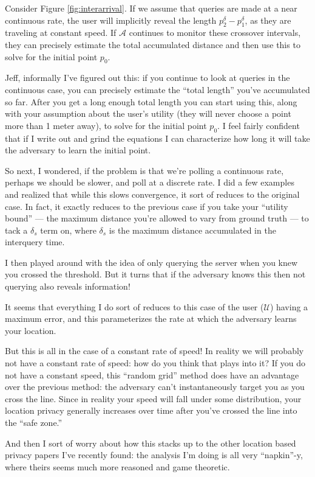\documentclass{article}
\begin{document}
Consider Figure \ref{fig:interarrival}.  If we assume that queries are
made at a near continuous rate, the user will implicitly reveal the
length $p_2^{\delta}-p_1^{\delta}$, as they are traveling at constant
speed.  If $\mathcal{A}$ continues to monitor these crossover
intervals, they can precisely estimate the total accumulated distance
and then use this to solve for the initial point $p_0$.

Jeff, informally I've figured out this: if you continue to look at
queries in the continuous case, you can precisely estimate the ``total
length'' you've accumulated so far.  After you get a long enough total
length you can start using this, along with your assumption about the
user's utility (they will never choose a point more than 1 meter
away), to solve for the initial point $p_0$.  I feel fairly confident
that if I write out and grind the equations I can characterize how
long it will take the adversary to learn the initial point.

So next, I wondered, if the problem is that we're polling a continuous
rate, perhaps we should be slower, and poll at a discrete rate.  I did
a few examples and realized that while this slows convergence, it sort
of reduces to the original case.  In fact, it exactly reduces to the
previous case if you take your ``utility bound'' --- the maximum
distance you're allowed to vary from ground truth --- to tack a
$\delta_s$ term on, where $\delta_s$ is the maximum distance
accumulated in the interquery time.

I then played around with the idea of only querying the server when
you knew you crossed the threshold.  But it turns that if the
adversary knows this then not querying also reveals information!

It seems that everything I do sort of reduces to this case of the user
($\mathcal{U}$) having a maximum error, and this parameterizes the
rate at which the adversary learns your location.

But this is all in the case of a constant rate of speed!  In reality
we will probably not have a constant rate of speed: how do you think
that plays into it?  If you do not have a constant speed, this
``random grid'' method does have an advantage over the previous
method: the adversary can't instantaneously target you as you cross
the line.  Since in reality your speed will fall under some
distribution, your location privacy generally increases over time
after you've crossed the line into the ``safe zone.''

And then I sort of worry about how this stacks up to the other
location based privacy papers I've recently found: the analysis I'm
doing is all very ``napkin''-y, where theirs seems much more reasoned
and game theoretic.

\end{document}
